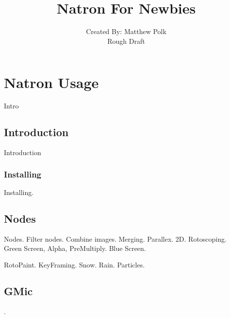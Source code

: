 \documentclass[10pt,oneside,openany,letterpaper]{memoir}
\title{Natron For Newbies}
\author{Created By: Matthew Polk\\Rough Draft}
\date{}
\begin{document}
\maketitle

\newpage
\tableofcontents*
\pagestyle{empty}


\cleardoublepage

%
\setcounter{page}{1}
\pagestyle{plain}

\part{Natron Usage}

Intro

\chapter{Introduction}
Introduction





\section{Installing}
Installing.








\chapter{Nodes}

Nodes. Filter nodes. Combine images. Merging. Parallex. 2D. Rotoscoping. \\
Green Screen, Alpha, PreMultiply. Blue Screen.

RotoPaint. KeyFraming. Snow. Rain. Particles.







\chapter{GMic}
.
\end{document}
